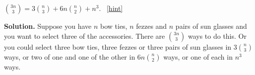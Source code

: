 \documentclass{book}
\begin{document}
\setcounter{project}{104}
\addtocounter{project}{-1}
\begin{activity}[]\label{activity-97}
\hypertarget{p-761}{}%
\(\binom{3n}{3} = 3 \binom{n}{3} + 6n \binom{n}{2} + n^{3}\).%
~\hfill{\tiny\hyperlink{a-104}{[hint]}\hypertarget{q-104}{}}\par\smallskip%
\noindent\textbf{Solution.}\hypertarget{solution-78}{}\quad%
\hypertarget{p-763}{}%
Suppose you have \(n\) bow ties, \(n\) fezzes and \(n\) pairs of sun glasses and you want to select three of the accessories.  There are \(\binom{3n}{3}\) ways to do this.  Or you could  select three bow ties, three fezzes or three pairs of sun glasses in \(3 \binom{n}{3}\) ways, or two of one and one of the other in  \(6n \binom{n}{2}\) ways, or one of each in \(n^3\) ways.%
\end{activity}
\end{document}

